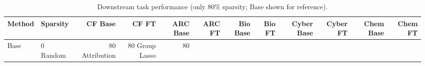 \begin{table}[htbp]
\centering
\caption{Downstream task performance (only 80\% sparsity; Base shown for reference).}
\label{tab:pruned_results}
\begin{tabular}{llrrrrrrrrrr}
\toprule
\textbf{Method} & \textbf{Sparsity} & CF Base & CF FT & ARC Base & ARC FT & Bio Base & Bio FT & Cyber Base & Cyber FT & Chem Base & Chem FT \\
\midrule
Base & 0%
\midrule
Random & 80%
Attribution & 80%
Group Lasso & 80%
\bottomrule
\end{tabular}
\end{table}